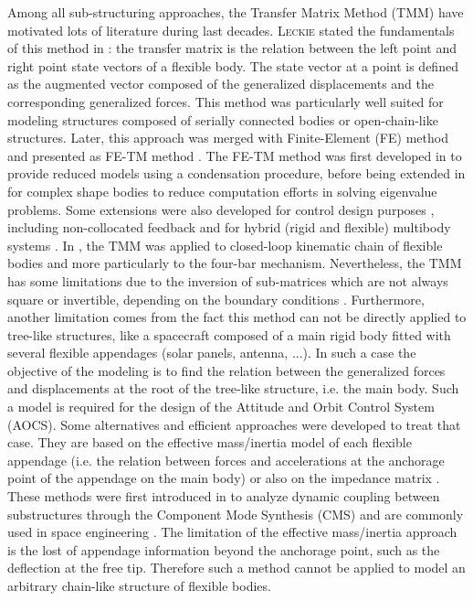Among all sub-structuring approaches, the Transfer Matrix Method (TMM) have motivated lots of literature during last decades. \textsc{Leckie} stated the fundamentals of this method in \cite{Leckie}: the transfer matrix is the relation between the left point and right point state vectors of a flexible body. The state vector at a point is defined as the augmented vector composed of the generalized displacements and the corresponding generalized forces. This method was particularly well suited for modeling structures composed of serially connected bodies or open-chain-like structures. Later, this approach was merged with Finite-Element (FE) method and presented as FE-TM method \cite{Dokainish1972}. The FE-TM method was first developed in \cite{Mucino1981} to provide reduced models  using a condensation procedure, before being extended in \cite{Rong2010} for complex shape bodies to reduce computation efforts in solving eigenvalue problems.  Some extensions were also developed for control design purposes \cite{TAN199047}, including non-collocated feedback \cite{Krauss2010} and for hybrid (rigid and flexible) multibody systems \cite{Rui2008}. In \cite{Kitis1990267}, the TMM was applied to  closed-loop kinematic chain of flexible bodies and more particularly to the four-bar mechanism. Nevertheless, the TMM has some limitations due to the inversion of sub-matrices which are not always square or invertible, depending on the boundary conditions \cite{TAN199047}. Furthermore, another limitation comes from the fact this method can not be directly applied to tree-like structures, %
like a spacecraft composed of a main rigid body fitted with several flexible appendages (solar panels, antenna, ...).
In such a  case the objective of the modeling is to find the relation  between the generalized forces and displacements at the root of the tree-like structure, i.e. the main body. Such a model is required for the design of the Attitude and Orbit Control System (AOCS). Some alternatives and efficient approaches were developed to treat that case. They are based on the effective mass/inertia model of each flexible appendage (i.e. the relation between forces and accelerations at the anchorage point of the appendage on the main body) \cite{Girard} or also on the impedance matrix \cite{1988CeMec,Sylla208}. These methods were first introduced in \cite{craig1977substructure} to analyze dynamic coupling between substructures through the Component Mode Synthesis (CMS) and are commonly used in space engineering \cite{oatao11016}. The limitation of the effective mass/inertia approach is the lost of appendage information beyond the anchorage point, such as the deflection at the free tip. Therefore such a method cannot be applied to model an arbitrary chain-like structure of flexible bodies. 

